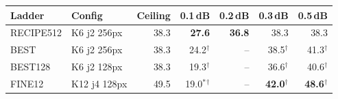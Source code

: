 \begin{tabular}{llrrrrr}
\toprule
Ladder & Config & Ceiling & 0.1\,dB & 0.2\,dB & 0.3\,dB & 0.5\,dB \\
\midrule
RECIPE512 & K6 j2 256px & 38.3 & \textbf{27.6} & \textbf{36.8} & 38.3 & 38.3 \\
BEST & K6 j2 256px & 38.3 & 24.2$^{\dagger}$ & -- & 38.5$^{\dagger}$ & 41.3$^{\dagger}$ \\
BEST128 & K6 j2 128px & 38.3 & 19.3$^{\dagger}$ & -- & 36.6$^{\dagger}$ & 40.6$^{\dagger}$ \\
FINE12 & K12 j4 128px & 49.5 & 19.0$^{\ast}$$^{\dagger}$ & -- & \textbf{42.0$^{\dagger}$} & \textbf{48.6$^{\dagger}$} \\
\bottomrule
\end{tabular}
